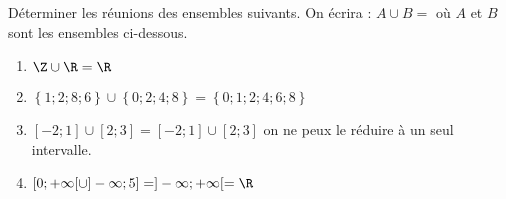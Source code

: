 
Déterminer les réunions des ensembles suivants. On écrira : $A \cup B = $ où $A$ et $B$ sont les ensembles ci-dessous.
\begin{enumerate}
\item $\Z\cup \R = \R$
\item $\left\lbrace 1;2;8;6  \right\rbrace \cup \left\lbrace 0;2;4;8  \right\rbrace =  \left\lbrace 0;1;2;4;6;8  \right\rbrace$
\item $[-2;1] \cup [2;3] = [-2;1] \cup [2;3]$ on ne peux le réduire à un seul intervalle.
\item $[0;+\infty[  \cup ]-\infty;5] = ]-\infty;+\infty[ = \R$
\end{enumerate}